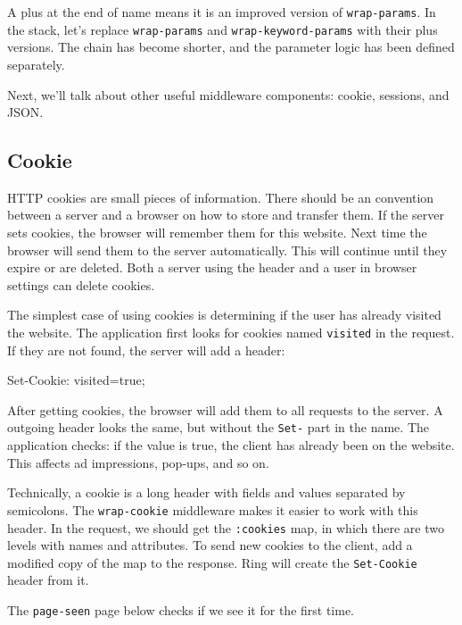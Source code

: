 A plus at the end of name means it is an improved version of \verb|wrap-params|. In the stack, let's replace \verb|wrap-params| and \verb|wrap-keyword-params| with their
plus versions. The chain has become shorter, and the parameter logic has been defined separately.

Next, we'll talk about other useful middleware components: cookie, sessions, and JSON.

\subsection{Cookie}


HTTP cookies are small pieces of information. There should be an convention between a server and a browser on how to store and transfer them. If the server sets cookies,
the browser will remember them for this website. Next time the browser will send them to the server automatically. This will continue until they expire or are deleted. Both a server using the header and a user in browser settings can delete cookies.

The simplest case of using cookies is determining if the user has already visited the website. The application first looks for cookies named \verb|visited| in the request. If they are not found, the server will add a header:

\begin{http}
Set-Cookie: visited=true;
\end{http}

After getting cookies, the browser will add them to all requests to the server. A outgoing header looks the same, but without the \verb|Set-| part in the name. The application checks: if the value is true, the client has already been on the website. This affects ad impressions, pop-ups, and so on.

Technically, a cookie is a long header with fields and values separated by semicolons. The \verb|wrap-cookie| middleware makes it easier to work with this header. In the request, we should get the \verb|:cookies| map, in which there are two levels with names and attributes. To send new cookies to the client, add a modified copy of the map to the response. Ring will create the \verb|Set-Cookie| header from it.

The \verb|page-seen| page below checks if we see it for the first time.


